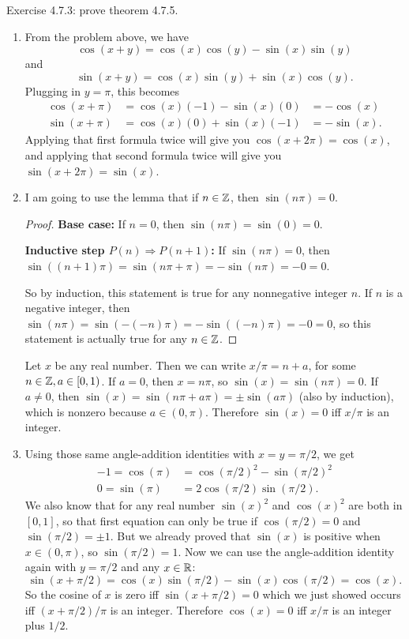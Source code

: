 \documentclass{article}
\begin{document}
\bigskip
\begin{prob}
    Exercise 4.7.3: prove theorem 4.7.5.
\end{prob}
\begin{enumerate}[label=(\alph*)]
    \item From the problem above, we have
\[ \cos(x+y) = \cos(x)\cos(y) - \sin(x)\sin(y) \]
and
\[ \sin(x+y) = \cos(x)\sin(y) + \sin(x)\cos(y). \]
Plugging in $y=\pi$, this becomes
\begin{align*}
    \cos(x+\pi) &= \cos(x)(-1) - \sin(x)(0) &= -\cos(x) \\
    \sin(x+\pi) &= \cos(x)(0) + \sin(x)(-1) &= -\sin(x).
\end{align*}
Applying that first formula twice will give you $\cos(x+2\pi)=\cos(x)$, and applying that second formula twice will give you $\sin(x + 2\pi) = \sin(x)$.
\item I am going to use the lemma that if $n \in \mathbb{Z}$, then $\sin(n \pi) = 0$.
\begin{proof}
    \textbf{Base case:} If $n=0$, then $\sin(n\pi)=\sin(0)=0$.
    \par
    \textbf{Inductive step $P(n) \Rightarrow P(n+1)$:} If $\sin(n\pi)=0$, then $\sin((n+1)\pi) = \sin(n\pi + \pi) = -\sin(n \pi) = -0=0$.
    \bigskip
    \par
    So by induction, this statement is true for any nonnegative integer $n$. If $n$ is a negative integer, then $\sin(n \pi) = \sin(-(-n)\pi) = -\sin((-n)\pi)=-0=0$, so this statement is actually true for any $n \in \mathbb{Z}$.
\end{proof}
Let $x$ be any real number. Then we can write $x/\pi=n+a$, for some $n \in \mathbb{Z}, a \in [0, 1)$. If $a=0$, then $x=n\pi$, so $\sin(x)=\sin(n\pi)=0$. If $a \neq 0$, then $\sin(x)=\sin(n\pi+a\pi)=\pm \sin(a\pi)$ (also by induction), which is nonzero because $a \in (0, \pi)$. Therefore $\sin(x)=0$ iff $x/\pi$ is an integer.
\item Using those same angle-addition identities with $x=y=\pi/2$, we get
    \begin{align*}
        -1 = \cos(\pi) &= \cos(\pi/2)^2 - \sin(\pi/2)^2 \\
        0 = \sin(\pi) &= 2 \cos(\pi/2) \sin(\pi/2).
    \end{align*}
    We also know that for any real number $\sin(x)^2$ and $\cos(x)^2$ are both in $[0, 1]$, so that first equation can only be true if $\cos(\pi/2)=0$ and $\sin(\pi/2)=\pm 1$. But we already proved that $\sin(x)$ is positive when $x \in (0, \pi)$, so $\sin(\pi/2)=1$. Now we can use the angle-addition identity again with $y=\pi/2$ and any $x \in \mathbb{R}$:
\[ \sin(x + \pi/2) = \cos(x)\sin(\pi/2) - \sin(x)\cos(\pi/2) = \cos(x). \]
So the cosine of $x$ is zero iff $\sin(x+\pi/2)=0$ which we just showed occurs iff $(x+\pi/2)/\pi$ is an integer. Therefore $\cos(x)=0$ iff $x/\pi$ is an integer plus $1/2$.
\end{enumerate}
\end{document}
